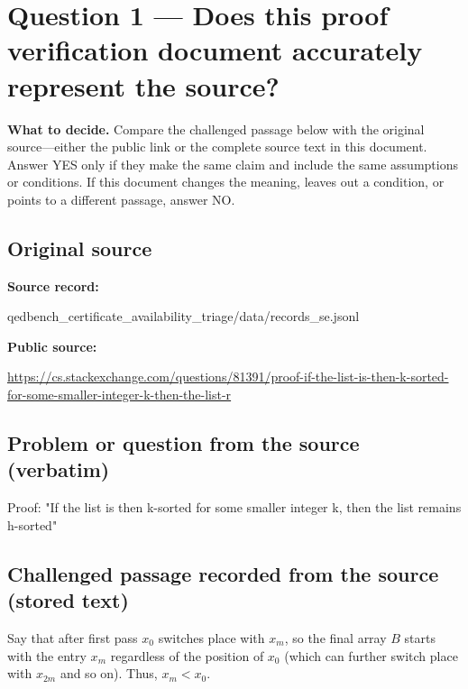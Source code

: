 \documentclass[11pt]{article}
\begin{document}
\section*{Question 1 --- Does this proof verification document accurately represent the source?}
\textbf{What to decide.} Compare the challenged passage below with the original source---either the public link or the complete source text in this document. Answer YES only if they make the same claim and include the same assumptions or conditions. If this document changes the meaning, leaves out a condition, or points to a different passage, answer NO.
\subsection*{Original source}
\textbf{Source record:}
\begin{Vsrc}
qedbench_certificate_availability_triage/data/records_se.jsonl
\end{Vsrc}
\textbf{Public source:}\par
\url{https://cs.stackexchange.com/questions/81391/proof-if-the-list-is-then-k-sorted-for-some-smaller-integer-k-then-the-list-r}\par
\subsection*{Problem or question from the source (verbatim)}
\begin{Vsrc}
Proof: "If the list is then k-sorted for some smaller integer k, then the list remains h-sorted"
\end{Vsrc}
\subsection*{Challenged passage recorded from the source (stored text)}
\begin{Vsrc}
Say that after first pass $x_0$ switches place with $x_m$, so the final array $B$ starts with the entry $x_m$ regardless of the position of $x_0$ (which can further switch place with $x_{2m}$ and so on). Thus, $x_m < x_0$.
\end{Vsrc}
\end{document}

